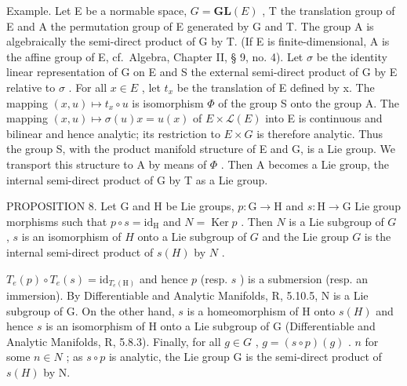 Example. Let E be a normable space, \(G = \mathbf{GL}(E)\) , T the translation group of E and A the permutation group of E generated by G and T. The group A is algebraically the semi-direct product of G by T. (If E is finite-dimensional, A is the affine group of E, cf.~Algebra, Chapter II, § 9, no. 4). Let \(\sigma\) be the identity linear representation of G on E and S the external semi-direct product of G by E relative to \(\sigma\) . For all \(x \in E\) , let \(t_{x}\) be the translation of E defined by x. The mapping \((x, u) \mapsto t_{x} \circ u\) is isomorphism \(\Phi\) of the group S onto the group A. The mapping \((x, u) \mapsto \sigma(u)x = u(x)\) of \(E \times \mathcal{L}(E)\) into E is continuous and bilinear and hence analytic; its restriction to \(E \times G\) is therefore analytic. Thus the group S, with the product manifold structure of E and G, is a Lie group. We transport this structure to A by means of \(\Phi\) . Then A becomes a Lie group, the internal semi-direct product of G by T as a Lie group.

PROPOSITION 8. Let G and H be Lie groups, \(p: \mathrm{G} \to \mathrm{H}\) and \(s: \mathrm{H} \to \mathrm{G}\) Lie group morphisms such that \(p \circ s = \mathrm{id}_{\mathrm{H}}\) and \(N = \operatorname{Ker} p\) . Then \(N\) is a Lie subgroup of \(G\) , \(s\) is an isomorphism of \(H\) onto a Lie subgroup of \(G\) and the Lie group \(G\) is the internal semi-direct product of \(s(H)\) by \(N\) .

\(T_{e}(p) \circ T_{e}(s) = \mathrm{id}_{T_{e}(\mathrm{H})}\) and hence \(p\) (resp. \(s\) ) is a submersion (resp. an immersion). By Differentiable and Analytic Manifolds, R, 5.10.5, N is a Lie subgroup of G. On the other hand, \(s\) is a homeomorphism of H onto \(s(H)\) and hence \(s\) is an isomorphism of H onto a Lie subgroup of G (Differentiable and Analytic Manifolds, R, 5.8.3). Finally, for all \(g \in G\) , \(g = (s \circ p)(g)\) . \(n\) for some \(n \in N\) ; as \(s \circ p\) is analytic, the Lie group G is the semi-direct product of \(s(H)\) by N.

